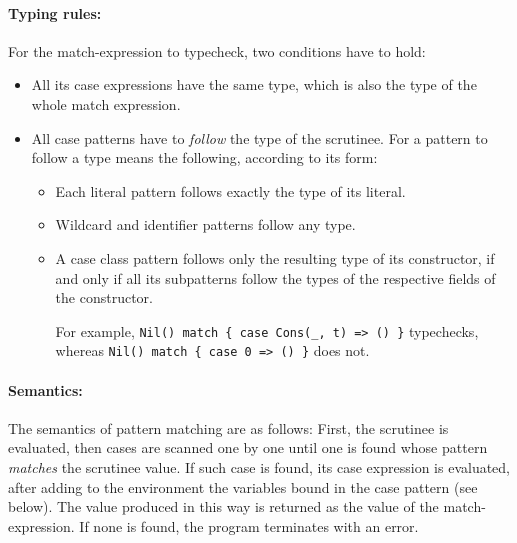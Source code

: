 \begin{itemize}
        \paragraph{Typing rules:} For the match-expression to typecheck, two conditions have to hold:
        \begin{itemize}
            \item All its case expressions have the same type,
                which is also the type of the whole match expression.
            \item All case patterns have to \emph{follow} the type of the scrutinee.
                For a pattern to follow a type means the following, according to its form:
                \begin{itemize}
                    \item Each literal pattern follows exactly the type of its literal.
                    \item Wildcard and identifier patterns follow any type.
                    \item A case class pattern follows only the resulting type of its constructor,
                        if and only if all its subpatterns follow the types of the respective
                        fields of the constructor.

                        For example, \lstinline|Nil() match { case Cons(_, t) => () }| typechecks,
                        whereas \lstinline|Nil() match { case 0 => () }| does not.
                \end{itemize}
        \end{itemize}

        \paragraph{Semantics:} The semantics of pattern matching are as follows:
        First, the scrutinee is evaluated, then cases are scanned one by one
        until one is found whose pattern \emph{matches} the scrutinee value.
        If such case is found, its case expression is evaluated,
        after adding to the environment the variables bound in the case pattern (see below).
        The value produced in this way is returned as the value of the match-expression.
        If none is found, the program terminates with an error.


\end{itemize}
